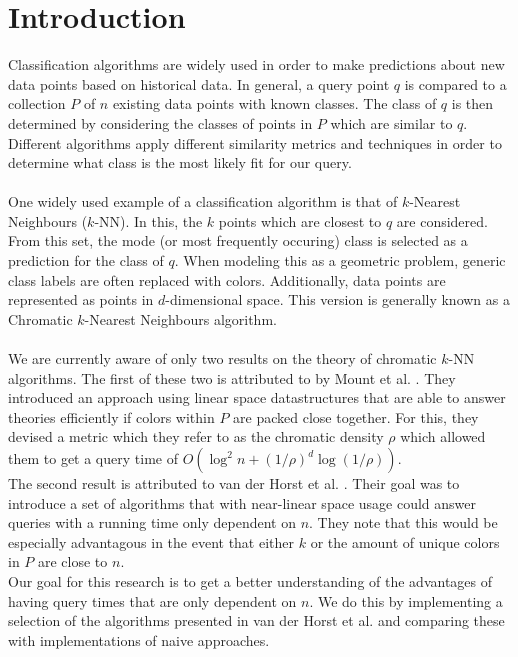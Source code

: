 \documentclass{article}
\newcommand{\fb}[1]{{#1}}
\begin{document}
\section{Introduction}
\fb{
    Classification algorithms are widely used in order to make predictions about new data points based on historical data. In general, a query point $q$ is compared to a collection $P$ of $n$ existing data points with known classes. The class of $q$ is then determined by considering the classes of points in $P$ which are similar to $q$. Different algorithms apply different similarity metrics and techniques in order to determine what class is the most likely fit for our query. \\\\
    One widely used example of a classification algorithm is that of $k$-Nearest Neighbours ($k$-NN). In this, the $k$ points which are closest to $q$ are considered. From this set, the mode (or most frequently occuring) class is selected as a prediction for the class of $q$. When modeling this as a geometric problem, generic class labels are often replaced with colors. Additionally, data points are represented as points in $d$-dimensional space. This version is generally known as a Chromatic $k$-Nearest Neighbours algorithm. \\\\
    We are currently aware of only two results on the theory of chromatic $k$-NN algorithms. The first of these two is attributed to by Mount et al. \cite{MOUNT200097}. They introduced an approach using linear space datastructures that are able to answer theories efficiently if colors within $P$ are packed close together. For this, they devised a metric which they refer to as the chromatic density $\rho$ which allowed them to get a query time of $O(\log^2 n + (1/\rho)^d\log(1/\rho))$.\\
    The second result is attributed to van der Horst et al. \cite{vanderhorst_et_al:LIPIcs.ESA.2022.67}. Their goal was to introduce a set of algorithms that with near-linear space usage could answer queries with a running time only dependent on $n$. They note that this would be especially advantagous in the event that either $k$ or the amount of unique colors in $P$ are close to $n$. \\
    Our goal for this research is to get a better understanding of the advantages of having query times that are only dependent on $n$. We do this by implementing a selection of the algorithms presented in van der Horst et al. and comparing these with implementations of naive approaches. \\\\
}
\end{document}
